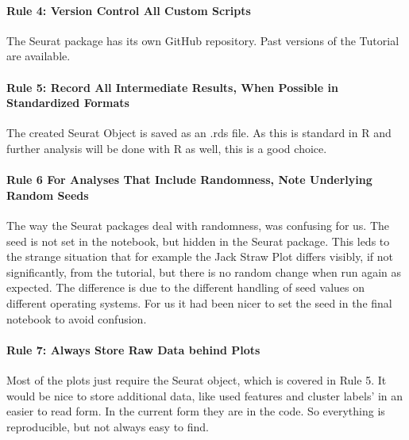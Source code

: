\documentclass[a4paper, 10pt]{scrartcl}
\begin{document}
\hypertarget{rule-4-version-control-all-custom-scripts}{%
\paragraph{Rule 4: Version Control All Custom
Scripts}\label{rule-4-version-control-all-custom-scripts}}

The Seurat package has its own GitHub repository. Past versions of the
Tutorial are available.

\hypertarget{rule-5-record-all-intermediate-results-when-possible-in-standardized-formats}{%
\paragraph{Rule 5: Record All Intermediate Results, When Possible in
Standardized
Formats}\label{rule-5-record-all-intermediate-results-when-possible-in-standardized-formats}}

The created Seurat Object is saved as an .rds file. As this is standard
in R and further analysis will be done with R as well, this is a good
choice.

\hypertarget{rule-6-for-analyses-that-include-randomness-note-underlying-random-seeds}{%
\paragraph{Rule 6 For Analyses That Include Randomness, Note Underlying
Random
Seeds}\label{rule-6-for-analyses-that-include-randomness-note-underlying-random-seeds}}

The way the Seurat packages deal with randomness, was confusing for us.
The seed is not set in the notebook, but hidden in the Seurat package.
This leds to the strange situation that for example the Jack Straw Plot
differs visibly, if not significantly, from the tutorial, but there is
no random change when run again as expected. The difference is due to
the different handling of seed values on different operating systems.
For us it had been nicer to set the seed in the final notebook to avoid
confusion.

\hypertarget{rule-7-always-store-raw-data-behind-plots}{%
\paragraph{Rule 7: Always Store Raw Data behind
Plots}\label{rule-7-always-store-raw-data-behind-plots}}

Most of the plots just require the Seurat object, which is covered in
Rule 5. It would be nice to store additional data, like used features
and cluster labels' in an easier to read form. In the current form they
are in the code. So everything is reproducible, but not always easy to
find.
\end{document}
